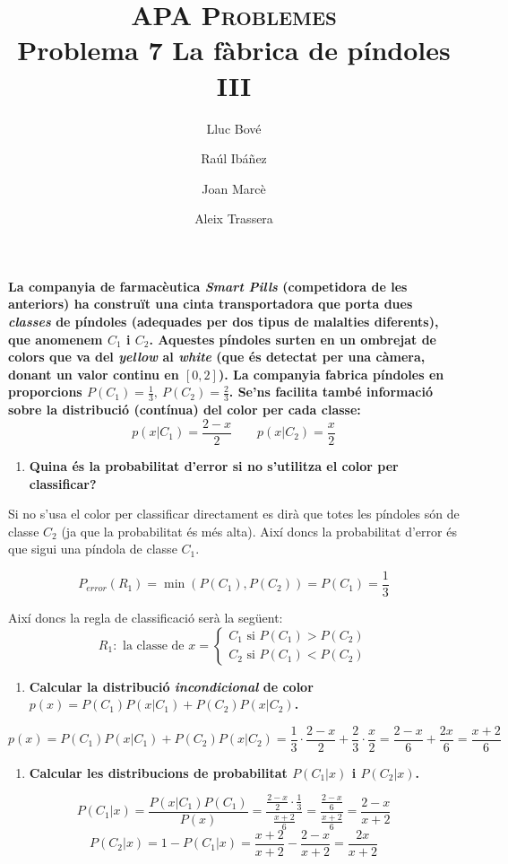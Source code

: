 \documentclass[a4paper]{article}
\title{\textsc{APA Problemes} \\ Problema 7 La fàbrica de píndoles III}
\author{Lluc Bové \and Raúl Ibáñez \and Joan Marcè \and Aleix Trassera}
\date{}
\begin{document}
\maketitle

\textbf{La companyia de farmacèutica \emph{Smart Pills} (competidora de les anteriors) ha construït una cinta transportadora que porta dues \emph{classes} de píndoles (adequades per dos tipus de malalties diferents), que anomenem $C_1$ i $C_2$. Aquestes píndoles surten en un ombrejat de colors que va del \emph{yellow} al \emph{white} (que és detectat per una càmera, donant un valor continu en $[0,2]$). La companyia fabrica píndoles en proporcions $P(C_1) = \frac{1}{3},\ P(C_2) = \frac{2}{3}$. Se'ns facilita també informació sobre la distribució (contínua) del color per cada classe: }
$$
p(x|C_1) = \frac{2 - x}{2} \qquad p(x|C_2) = \frac{x}{2}
$$

\begin{enumerate}
	\item \textbf{Quina és la probabilitat d'error si no s'utilitza el color per classificar?}
\end{enumerate}

Si no s'usa el color per classificar directament es dirà que totes les píndoles són de classe $C_2$ (ja que la probabilitat és més alta). Així doncs la probabilitat d'error és que sigui una píndola de classe $C_1$.

$$
P_{error}(R_1) = \min(P(C_1),P(C_2)) = P(C_1) = \frac{1}{3}
$$

Així doncs la regla de classificació serà la següent:
$$
R_1: \text{ la classe de } x =
\begin{cases}
C_1 \text{ si } P(C_1) > P(C_2) \\
C_2 \text{ si } P(C_1) < P(C_2)
\end{cases}
$$

\begin{enumerate}[resume]
	\item \textbf{Calcular la distribució \emph{incondicional} de color $p(x) = P(C_1)P(x|C_1) + P(C_2)P(x|C_2)$.}
\end{enumerate}
$$
p(x) = P(C_1)P(x|C_1) + P(C_2)P(x|C_2) = \frac{1}{3}·\frac{2 - x}{2} + \frac{2}{3}·\frac{x}{2} = \frac{2 - x}{6} + \frac{2x}{6} = \boxed{\frac{x + 2}{6}} 
$$

\begin{enumerate}[resume]
	\item \textbf{Calcular les distribucions de probabilitat $P(C_1|x)$ i $P(C_2|x)$.}
\end{enumerate}
$$
P(C_1|x) = \frac{P(x|C_1)P(C_1)}{P(x)} = 
\frac{\frac{2 - x}{2}·\frac{1}{3}}{\frac{x + 2}{6}} =
\frac{\frac{2 - x}{6}}{\frac{x + 2}{6}} = \boxed{\frac{2 - x}{x + 2}}
$$
$$
P(C_2|x) = 1 - P(C_1|x) = \frac{x + 2}{x + 2} - \frac{2 - x}{x + 2} =
\boxed{\frac{2x}{x + 2}}
$$
\end{document}
